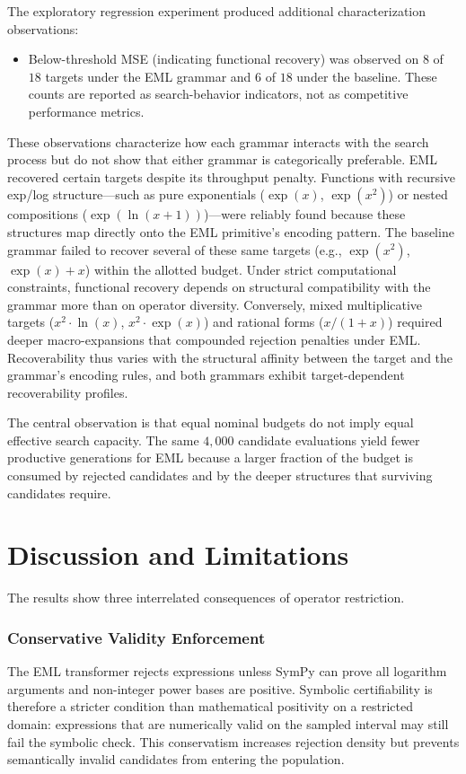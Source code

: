\documentclass[runningheads]{llncs}
\newcommand{\expf}{\operatorname{exp}}
\newcommand{\lnf}{\operatorname{ln}}
\begin{document}
The exploratory regression experiment produced additional characterization
observations:
\begin{itemize}[itemsep=0pt,topsep=0pt]
  \item Below-threshold MSE (indicating functional recovery) was observed on
        $8$ of $18$ targets under the EML grammar and $6$ of $18$ under the
        baseline. These counts are reported as search-behavior indicators,
        not as competitive performance metrics.
\end{itemize}
These observations characterize how each grammar interacts with the search process but do not show that either grammar is categorically preferable. EML recovered certain targets despite its throughput penalty. Functions with recursive exp/log structure---such as pure exponentials ($\expf(x)$, $\expf(x^2)$) or nested compositions ($\expf(\lnf(x+1))$)---were reliably found because these structures map directly onto the EML primitive's encoding pattern. The baseline grammar failed to recover several of these same targets (e.g., $\expf(x^2)$, $\expf(x) + x$) within the allotted budget. Under strict computational constraints, functional recovery depends on structural compatibility with the grammar more than on operator diversity. Conversely, mixed multiplicative targets ($x^2 \cdot \lnf(x)$, $x^2 \cdot \expf(x)$) and rational forms ($x / (1+x)$) required deeper macro-expansions that compounded rejection penalties under EML. Recoverability thus varies with the structural affinity between the target and the grammar's encoding rules, and both grammars exhibit target-dependent recoverability profiles.

The central observation is that equal nominal budgets do not imply equal
effective search capacity. The same $4{,}000$ candidate evaluations yield
fewer productive generations for EML because a larger fraction of the budget
is consumed by rejected candidates and by the deeper structures that
surviving candidates require.

\section{Discussion and Limitations}\label{sec:discussion}

The results show three interrelated consequences of operator restriction.

\subsubsection{Conservative Validity Enforcement}
The EML transformer rejects expressions unless SymPy can prove all
logarithm arguments and non-integer power bases are positive. Symbolic
certifiability is therefore a stricter condition than mathematical
positivity on a restricted domain: expressions that are numerically valid
on the sampled interval may still fail the symbolic check. This
conservatism increases rejection density but prevents semantically invalid
candidates from entering the population.
\end{document}
